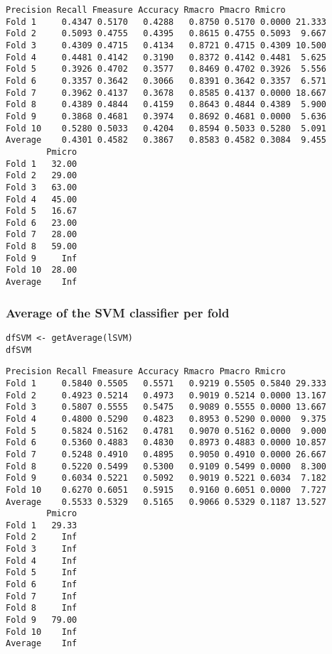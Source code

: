 \documentclass[]{article}
\begin{document}
\begin{lstlisting}[frame=single]
        Precision Recall Fmeasure Accuracy Rmacro Pmacro Rmicro
Fold 1     0.4347 0.5170   0.4288   0.8750 0.5170 0.0000 21.333
Fold 2     0.5093 0.4755   0.4395   0.8615 0.4755 0.5093  9.667
Fold 3     0.4309 0.4715   0.4134   0.8721 0.4715 0.4309 10.500
Fold 4     0.4481 0.4142   0.3190   0.8372 0.4142 0.4481  5.625
Fold 5     0.3926 0.4702   0.3577   0.8469 0.4702 0.3926  5.556
Fold 6     0.3357 0.3642   0.3066   0.8391 0.3642 0.3357  6.571
Fold 7     0.3962 0.4137   0.3678   0.8585 0.4137 0.0000 18.667
Fold 8     0.4389 0.4844   0.4159   0.8643 0.4844 0.4389  5.900
Fold 9     0.3868 0.4681   0.3974   0.8692 0.4681 0.0000  5.636
Fold 10    0.5280 0.5033   0.4204   0.8594 0.5033 0.5280  5.091
Average    0.4301 0.4582   0.3867   0.8583 0.4582 0.3084  9.455
        Pmicro
Fold 1   32.00
Fold 2   29.00
Fold 3   63.00
Fold 4   45.00
Fold 5   16.67
Fold 6   23.00
Fold 7   28.00
Fold 8   59.00
Fold 9     Inf
Fold 10  28.00
Average    Inf
\end{lstlisting}

\subsubsection{Average of the SVM classifier per fold}

\begin{lstlisting}[frame=single]
dfSVM <- getAverage(lSVM)
dfSVM
\end{lstlisting}

\begin{lstlisting}[frame=single]
        Precision Recall Fmeasure Accuracy Rmacro Pmacro Rmicro
Fold 1     0.5840 0.5505   0.5571   0.9219 0.5505 0.5840 29.333
Fold 2     0.4923 0.5214   0.4973   0.9019 0.5214 0.0000 13.167
Fold 3     0.5807 0.5555   0.5475   0.9089 0.5555 0.0000 13.667
Fold 4     0.4800 0.5290   0.4823   0.8953 0.5290 0.0000  9.375
Fold 5     0.5824 0.5162   0.4781   0.9070 0.5162 0.0000  9.000
Fold 6     0.5360 0.4883   0.4830   0.8973 0.4883 0.0000 10.857
Fold 7     0.5248 0.4910   0.4895   0.9050 0.4910 0.0000 26.667
Fold 8     0.5220 0.5499   0.5300   0.9109 0.5499 0.0000  8.300
Fold 9     0.6034 0.5221   0.5092   0.9019 0.5221 0.6034  7.182
Fold 10    0.6270 0.6051   0.5915   0.9160 0.6051 0.0000  7.727
Average    0.5533 0.5329   0.5165   0.9066 0.5329 0.1187 13.527
        Pmicro
Fold 1   29.33
Fold 2     Inf
Fold 3     Inf
Fold 4     Inf
Fold 5     Inf
Fold 6     Inf
Fold 7     Inf
Fold 8     Inf
Fold 9   79.00
Fold 10    Inf
Average    Inf
\end{lstlisting}
\end{document}
